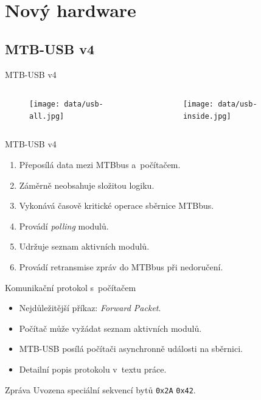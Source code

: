 \documentclass[aspectratio=169]{beamer}
\begin{document}
\section{Nový hardware}
\subsection{MTB-USB v4}

\begin{frame}{MTB-USB v4}
\begin{columns}
	\begin{column}{.4\textwidth}
		\begin{figure}
		\texttt{[image: data/usb-all.jpg]}
		\end{figure}
	\end{column}
	\begin{column}{.6\textwidth}
		\begin{figure}
		\texttt{[image: data/usb-inside.jpg]}
		\end{figure}
	\end{column}
\end{columns}
\end{frame}


\begin{frame}{MTB-USB v4}
\begin{enumerate}
\item Přeposílá data mezi MTBbus a počítačem.
\item Záměrně neobsahuje složitou logiku.
\item Vykonává časově kritické operace sběrnice MTBbus.
\item Provádí \textit{polling} modulů.
\item Udržuje seznam aktivních modulů.
\item Provádí retransmise zpráv do MTBbus při nedoručení.
\end{enumerate}
\end{frame}


\begin{frame}{Komunikační protokol s počítačem}
\begin{itemize}
\item Nejdůležitější příkaz: \textit{Forward Packet}.
\item Počítač může vyžádat seznam aktivních modulů.
\item MTB-USB posílá počítači asynchronně události na sběrnici.
\item Detailní popis protokolu v textu práce.
\end{itemize}

\begin{alertblock}{Zpráva}
Uvozena speciální sekvencí bytů \texttt{0x2A} \texttt{0x42}.
\end{alertblock}
\end{frame}
\end{document}
